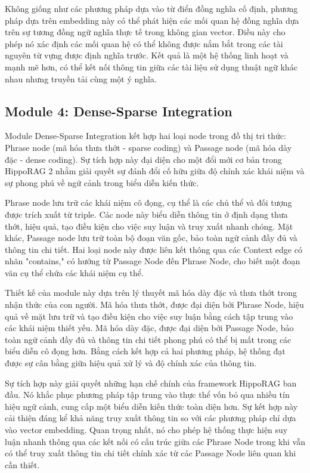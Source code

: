 \documentclass[../main.tex]{subfiles}
\begin{document}
Không giống như các phương pháp dựa vào từ điển đồng nghĩa cố định, phương pháp dựa trên embedding này có thể phát hiện các mối quan hệ đồng nghĩa dựa trên sự tương đồng ngữ nghĩa thực tế trong không gian vector. Điều này cho phép nó xác định các mối quan hệ có thể không được nắm bắt trong các tài nguyên từ vựng được định nghĩa trước. Kết quả là một hệ thống linh hoạt và mạnh mẽ hơn, có thể kết nối thông tin giữa các tài liệu sử dụng thuật ngữ khác nhau nhưng truyền tải cùng một ý nghĩa.

\subsection{Module 4: Dense-Sparse Integration}
Module Dense-Sparse Integration kết hợp hai loại node trong đồ thị tri thức: Phrase node (mã hóa thưa thớt - sparse coding) và Passage node (mã hóa dày đặc - dense coding). Sự tích hợp này đại diện cho một đổi mới cơ bản trong HippoRAG 2 nhằm giải quyết sự đánh đổi cố hữu giữa độ chính xác khái niệm và sự phong phú về ngữ cảnh trong biểu diễn kiến thức.

Phrase node lưu trữ các khái niệm cô đọng, cụ thể là các chủ thể và đối tượng được trích xuất từ triple. Các node này biểu diễn thông tin ở định dạng thưa thớt, hiệu quả, tạo điều kiện cho việc suy luận và truy xuất nhanh chóng. Mặt khác, Passage node lưu trữ toàn bộ đoạn văn gốc, bảo toàn ngữ cảnh đầy đủ và thông tin chi tiết. Hai loại node này được liên kết thông qua các Context edge có nhãn "contains," có hướng từ Passage Node đến Phrase Node, cho biết một đoạn văn cụ thể chứa các khái niệm cụ thể.

Thiết kế của module này dựa trên lý thuyết mã hóa dày đặc và thưa thớt trong nhận thức của con người. Mã hóa thưa thớt, được đại diện bởi Phrase Node, hiệu quả về mặt lưu trữ và tạo điều kiện cho việc suy luận bằng cách tập trung vào các khái niệm thiết yếu. Mã hóa dày đặc, được đại diện bởi Passage Node, bảo toàn ngữ cảnh đầy đủ và thông tin chi tiết phong phú có thể bị mất trong các biểu diễn cô đọng hơn. Bằng cách kết hợp cả hai phương pháp, hệ thống đạt được sự cân bằng giữa hiệu quả xử lý và độ chính xác của thông tin.

Sự tích hợp này giải quyết những hạn chế chính của framework HippoRAG ban đầu. Nó khắc phục phương pháp tập trung vào thực thể vốn bỏ qua nhiều tín hiệu ngữ cảnh, cung cấp một biểu diễn kiến thức toàn diện hơn. Sự kết hợp này cải thiện đáng kể khả năng truy xuất thông tin so với các phương pháp chỉ dựa vào vector embedding. Quan trọng nhất, nó cho phép hệ thống thực hiện suy luận nhanh thông qua các kết nối có cấu trúc giữa các Phrase Node trong khi vẫn có thể truy xuất thông tin chi tiết chính xác từ các Passage Node liên quan khi cần thiết.
\end{document}
